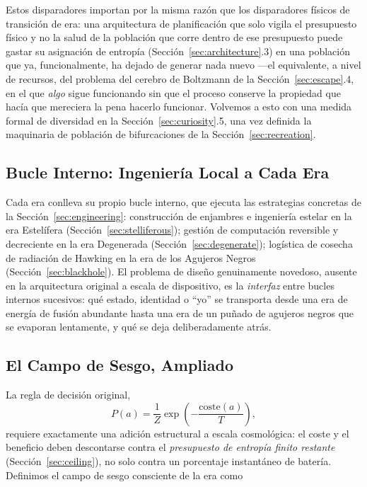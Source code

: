 \documentclass[11pt]{article}
\begin{document}
\noindent Estos disparadores importan por la misma razón que los disparadores físicos de transición de era: una arquitectura de planificación que solo vigila el presupuesto físico y no la salud de la población que corre dentro de ese presupuesto puede gastar su asignación de entropía (Sección~\ref{sec:architecture}.3) en una población que ya, funcionalmente, ha dejado de generar nada nuevo —el equivalente, a nivel de recursos, del problema del cerebro de Boltzmann de la Sección~\ref{sec:escape}.4, en el que \emph{algo} sigue funcionando sin que el proceso conserve la propiedad que hacía que mereciera la pena hacerlo funcionar. Volvemos a esto con una medida formal de diversidad en la Sección~\ref{sec:curiosity}.5, una vez definida la maquinaria de población de bifurcaciones de la Sección~\ref{sec:recreation}.

\subsection{Bucle Interno: Ingeniería Local a Cada Era}

Cada era conlleva su propio bucle interno, que ejecuta las estrategias concretas de la Sección~\ref{sec:engineering}: construcción de enjambres e ingeniería estelar en la era Estelífera (Sección~\ref{sec:stelliferous}); gestión de computación reversible y decreciente en la era Degenerada (Sección~\ref{sec:degenerate}); logística de cosecha de radiación de Hawking en la era de los Agujeros Negros (Sección~\ref{sec:blackhole}). El problema de diseño genuinamente novedoso, ausente en la arquitectura original a escala de dispositivo, es la \emph{interfaz} entre bucles internos sucesivos: qué estado, identidad o ``yo'' se transporta desde una era de energía de fusión abundante hasta una era de un puñado de agujeros negros que se evaporan lentamente, y qué se deja deliberadamente atrás.

\subsection{El Campo de Sesgo, Ampliado}

La regla de decisión original,
\begin{equation}
\label{eq:bias-original}
P(a) = \frac{1}{Z}\exp\left(-\frac{\mathrm{coste}(a)}{T}\right),
\end{equation}
requiere exactamente una adición estructural a escala cosmológica: el coste y el beneficio deben descontarse contra el \emph{presupuesto de entropía finito restante} (Sección~\ref{sec:ceiling}), no solo contra un porcentaje instantáneo de batería. Definimos el campo de sesgo consciente de la era como
\end{document}

